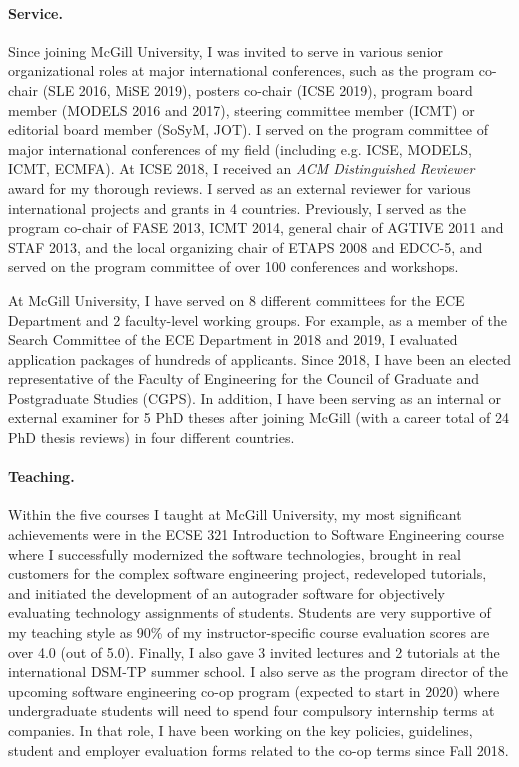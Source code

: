 \paragraph{Service.}
Since joining McGill University, I was invited to serve in various senior organizational roles at major international conferences, such as the program co-chair (SLE 2016, MiSE 2019), posters co-chair (ICSE 2019), program board member (MODELS 2016 and 2017), steering committee member (ICMT) or editorial board member (SoSyM, JOT). I served on the program committee of major international conferences of my field (including e.g. ICSE, MODELS, ICMT, ECMFA). At ICSE 2018, I received an \emph{ACM Distinguished Reviewer} award for my thorough reviews. I served as an external reviewer for various international projects and grants in 4 countries. Previously, I served as the program co-chair of FASE 2013, ICMT 2014, general chair of AGTIVE 2011 and STAF 2013, and the local organizing chair of ETAPS 2008 and EDCC-5, and served on the program committee of over 100 conferences and workshops.

At McGill University, I have served on 8 different committees for the ECE Department and 2 faculty-level working groups. For example, as a member of the Search Committee of the ECE Department in 2018 and 2019, I evaluated application packages of hundreds of applicants. Since 2018, I have been an elected representative of the Faculty of Engineering for the Council of Graduate and Postgraduate Studies (CGPS). In addition, I have been serving as an internal or external examiner for 5 PhD theses after joining McGill (with a career total of 24 PhD thesis reviews) in four different countries.


\paragraph{Teaching.}
Within the five courses I taught at McGill University, my most significant achievements were in the ECSE 321 Introduction to Software Engineering course where I successfully modernized the software technologies, brought in real customers for the complex software engineering project, redeveloped tutorials, and initiated the development of an autograder software for objectively evaluating technology assignments of students. Students are very supportive of my teaching style as 90\% of my instructor-specific course evaluation scores are over 4.0 (out of 5.0). Finally, I also gave 3 invited lectures and 2 tutorials at the international DSM-TP summer school. I also serve as the program director of the upcoming software engineering co-op program (expected to start in 2020) where undergraduate students will need to spend four compulsory internship terms at companies. In that role, I have been working on the key policies, guidelines, student and employer evaluation forms related to the co-op terms since Fall 2018.

